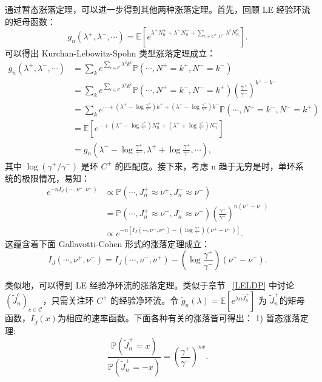 通过暂态涨落定理，可以进一步得到其他两种涨落定理。首先，回顾 LE 经验环流的矩母函数：
\begin{equation*}
    g_n(\lambda^+,\lambda^-,\cdots)
    = \mathbb{E}\left[e^{\lambda^+N^+_n+\lambda^-N^-_n+\sum_{c\neq C^+,C^-}\lambda^cN^c_n}\right].
\end{equation*}
可以得出 Kurchan-Lebowitz-Spohn 类型涨落定理成立：
\begin{align*}
    g_n(\lambda^+,\lambda^-,\cdots)
    &= \sum_{k}e^{\sum_{c\in\mathcal{C}}\lambda^ck^c}\mathbb{P}\left(\cdots,N^+=k^+,N^-=k^-\right)\\
    &= \sum_{k}e^{\sum_{c\in\mathcal{C}}\lambda^ck^c}
    \mathbb{P}\left(\cdots,N^+=k^-,N^-=k^+\right)\left(\frac{\gamma^+}{\gamma^-}\right)^{k^+-k^-}\\
    &= \sum_{k}e^{\cdots+\left(\lambda^+-\log\frac{\gamma^+}{\gamma^-}\right)k^++
    \left(\lambda^--\log\frac{\gamma^-}{\gamma^+}\right)k^-}\mathbb{P}(\cdots,N^+=k^-,N^-=k^+)\\
    &= \mathbb{E}\left[e^{\cdots+\left(\lambda^--\log\frac{\gamma^+}{\gamma^-}\right)N^+_n+
    \left(\lambda^++\log\frac{\gamma^+}{\gamma^-}\right)N^-_n}\right]\\
    &= g_n\left(\lambda^--\log\frac{\gamma^+}{\gamma^-},
    \lambda^++\log\frac{\gamma^+}{\gamma^-},\cdots\right),
\end{align*}
其中 $\log(\gamma^+/\gamma^-)$ 是环 $C^+$ 的匹配度。接下来，考虑 n 趋于无穷是时，单环系统的极限情况，易知：
\begin{align*}
e^{-nI_J(\cdots,\nu^+,\nu^-)}
&\propto \mathbb{P}\left(\cdots,J^+_n\approx\nu^+,J^-_n\approx\nu^-\right)\\
&= \mathbb{P}\left(\cdots,J^+_n\approx\nu^-,J^-_n\approx\nu^+\right)
\left(\frac{\gamma^+}{\gamma^-}\right)^{n(\nu^+-\nu^-)}\\
&\propto e^{-n\left[I_J(\cdots,\nu^-,\nu^+)-\left(\log\frac{\gamma^+}{\gamma^-}\right)
(\nu^+-\nu^-)\right]}.
\end{align*}
这蕴含着下面 Gallavotti-Cohen 形式的涨落定理成立：
\begin{equation}\label{G-C type fluctuation}
    I_J(\cdots,\nu^+,\nu^-)=I_J(\cdots,\nu^-,\nu^+)-\left(\log\frac{\gamma^+}{\gamma^-}\right)(\nu^+-\nu^-).
\end{equation}

类似地，可以得到 LE 经验净环流的涨落定理。类似于章节 ~\ref{LELDP} 中讨论 $(\tilde{J}^c_n)_{c\in\mathcal{C}}$，只需关注环 $C^+$ 的经验净环流。令
$\tilde{g}_n(\lambda) = \mathbb{E}[e^{\lambda n\tilde{J}^+_n}]$ 为 $\tilde{J}^+_n$的矩母函数，$I_{\tilde{J}}(x)$为相应的速率函数。下面各种有关的涨落皆可得出：
1) 暂态涨落定理:
\begin{equation*}
\frac{\mathbb{P}(\tilde{J}^+_n=x)}{\mathbb{P}(\tilde{J}^+_n=-x)}
= \left(\frac{\gamma^+}{\gamma^-}\right)^{nx}.
\end{equation*}

